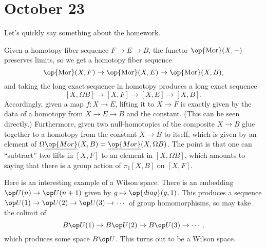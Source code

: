 \documentclass[../notes.tex]{subfiles}
\begin{document}
\section{October 23}
Let's quickly say something about the homework.
\begin{remark}
	Given a homotopy fiber sequence $F\to E\to B$, the functor $\op{\mathrm{Mor}}(X,-)$ preserves limits, so we get a homotopy fiber sequence
	\[\op{\mathrm{Mor}}(X,F)\to\op{\mathrm{Mor}}(X,E)\to\op{\mathrm{Mor}}(X,B),\]
	and taking the long exact sequence in homotopy produces a long exact sequence
	\[[X,\Omega B]\to[X,F]\to[X,E]\to[X,B].\]
	Accordingly, given a map $f\colon X\to E$, lifting it to $X\to F$ is exactly given by the data of a homotopy from $X\to E\to B$ and the constant. (This can be seen directly.) Furthermore, given two null-homotopies of the composite $X\to B$ glue together to a homotopy from the constant $X\to B$ to itself, which is given by an element of $\Omega\underline{\op{Mor}}(X,B)=\underline{\op{Mor}}(X,\Omega B)$. The point is that one can ``subtract'' two lifts in $[X,F]$ to an element in $[X,\Omega B]$, which amounts to saying that there is a group action of $\pi_1[X,B]$ on $[X,F]$.
\end{remark}
\begin{example}
	Here is an interesting example of a Wilson space. There is an embedding $\op U(n)\to\op U(n+1)$ given by $g\mapsto\op{diag}(g,1)$. This produces a sequence $\op U(1)\to\op U(2)\to\op U(3)\to\cdots$ of group homomorphisms, so may take the colimit of
	\[B\op U(1)\to B\op U(2)\to B\op U(3)\to\cdots,\]
	which produces some space $B\op U$. This turns out to be a Wilson space.
\end{example}
\end{document}
